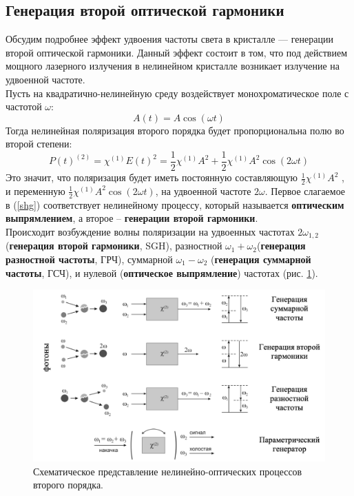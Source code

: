 \subsection*{Генерация второй оптической гармоники} 
\hspace{2mm}
Обсудим подробнее эффект удвоения частоты света в кристалле — генерации второй оптической гармоники. Данный эффект состоит в том, что под действием мощного лазерного излучения в нелинейном кристалле возникает излучение на удвоенной частоте.
\\
\hspace{2mm}
Пусть на квадратично-нелинейную среду воздействует монохроматическое поле с частотой $\omega$:
\begin{equation}\label{shg:e(t)}
A(t) = A\cos(\omega t)
\end{equation}
Тогда нелинейная поляризация второго порядка будет пропорциональна полю во второй степени:
\begin{equation}\label{shg}
P(t)^{(2)} = \chi^{(1)}E(t)^2 = \frac{1}{2}\chi^{(1)}A^2 + \frac{1}{2}\chi^{(1)}A^2\cos(2\omega t)
\end{equation}
Это значит, что поляризация будет иметь постоянную составляющую $ \frac{1}{2}\chi^{(1)}A^2$ , и переменную $\frac{1}{2}\chi^{(1)}A^2\cos(2\omega t)$, на удвоенной частоте $2\omega$. Первое слагаемое в (\ref{shg}) соответствует нелинейному процессу, который называется \textbf{оптическим выпрямлением}, а второе – \textbf{генерации второй гармоники}. 
\\
Происходит возбуждение волны поляризации на удвоенных частотах $2\omega_{1,2}$ (\textbf{генерация второй гармоники}, SGH), разностной $\omega_1 + \omega_2$(\textbf{генерация разностной частоты}, ГРЧ), суммарной $\omega_1 - \omega_2$ (\textbf{генерация суммарной частоты}, ГСЧ), и нулевой (\textbf{оптическое выпрямление}) частотах (рис. \ref{sghPictr}).
\begin{figure}[h]
	\centering
	\includegraphics[width=0.7\linewidth]{images/shg.png}
	\caption{Схематическое представление нелинейно-оптических процессов второго порядка.}
	\label{sghPictr}
\end{figure}

